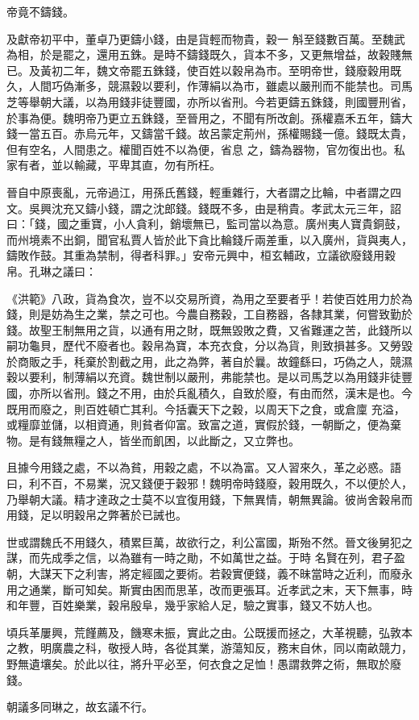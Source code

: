 \begin{pinyinscope}
 帝竟不鑄錢。



 及獻帝初平中，董卓乃更鑄小錢，由是貨輕而物貴，穀一
 斛至錢數百萬。至魏武為相，於是罷之，還用五銖。是時不鑄錢既久，貨本不多，又更無增益，故穀賤無已。及黃初二年，魏文帝罷五銖錢，使百姓以穀帛為市。至明帝世，錢廢穀用既久，人間巧偽漸多，競濕穀以要利，作薄絹以為市，雖處以嚴刑而不能禁也。司馬芝等舉朝大議，以為用錢非徒豐國，亦所以省刑。今若更鑄五銖錢，則國豐刑省，於事為便。魏明帝乃更立五銖錢，至晉用之，不聞有所改創。孫權嘉禾五年，鑄大錢一當五百。赤烏元年，又鑄當千錢。故呂蒙定荊州，孫權賜錢一億。錢既太貴，但有空名，人間患之。權聞百姓不以為便，省息
 之，鑄為器物，官勿復出也。私家有者，並以輸藏，平卑其直，勿有所枉。



 晉自中原喪亂，元帝過江，用孫氏舊錢，輕重雜行，大者謂之比輪，中者謂之四文。吳興沈充又鑄小錢，謂之沈郎錢。錢既不多，由是稍貴。孝武太元三年，詔曰：「錢，國之重寶，小人貪利，銷壞無已，監司當以為意。廣州夷人寶貴銅鼓，而州境素不出銅，聞官私賈人皆於此下貪比輪錢斤兩差重，以入廣州，貨與夷人，鑄敗作鼓。其重為禁制，得者科罪。」安帝元興中，桓玄輔政，立議欲廢錢用穀帛。孔琳之議曰：



 《洪範》八政，貨為食次，豈不以交易所資，為用之至要者乎！若使百姓用力於為
 錢，則是妨為生之業，禁之可也。今農自務穀，工自務器，各隸其業，何嘗致勤於錢。故聖王制無用之貨，以通有用之財，既無毀敗之費，又省難運之苦，此錢所以嗣功龜貝，歷代不廢者也。穀帛為寶，本充衣食，分以為貨，則致損甚多。又勞毀於商販之手，秏棄於割截之用，此之為弊，著自於曩。故鐘繇曰，巧偽之人，競濕穀以要利，制薄絹以充資。魏世制以嚴刑，弗能禁也。是以司馬芝以為用錢非徒豐國，亦所以省刑。錢之不用，由於兵亂積久，自致於廢，有由而然，漢末是也。今既用而廢之，則百姓頓亡其利。今括囊天下之穀，以周天下之食，或倉廩
 充溢，或糧靡並儲，以相資通，則貧者仰富。致富之道，實假於錢，一朝斷之，便為棄物。是有錢無糧之人，皆坐而飢困，以此斷之，又立弊也。



 且據今用錢之處，不以為貧，用穀之處，不以為富。又人習來久，革之必惑。語曰，利不百，不易業，況又錢便于穀邪！魏明帝時錢廢，穀用既久，不以便於人，乃舉朝大議。精才達政之士莫不以宜復用錢，下無異情，朝無異論。彼尚舍穀帛而用錢，足以明穀帛之弊著於已誡也。



 世或謂魏氏不用錢久，積累巨萬，故欲行之，利公富國，斯殆不然。晉文後舅犯之謀，而先成季之信，以為雖有一時之勛，不如萬世之益。于時
 名賢在列，君子盈朝，大謀天下之利害，將定經國之要術。若穀實便錢，義不昧當時之近利，而廢永用之通業，斷可知矣。斯實由困而思革，改而更張耳。近孝武之末，天下無事，時和年豐，百姓樂業，穀帛殷阜，幾乎家給人足，驗之實事，錢又不妨人也。



 頃兵革屢興，荒饉薦及，饑寒未振，實此之由。公既援而拯之，大革視聽，弘敦本之教，明廣農之科，敬授人時，各從其業，游蕩知反，務末自休，同以南畝競力，野無遺壤矣。於此以往，將升平必至，何衣食之足恤！愚謂救弊之術，無取於廢錢。



 朝議多同琳之，故玄議不行。



\end{pinyinscope}